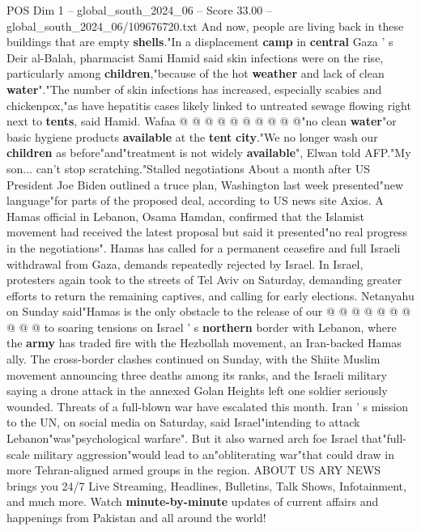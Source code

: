 \begin{textsample}{POS Dim 1 – global\_south\_2024\_06 – Score 33.00 – global\_south\_2024\_06/109676720.txt}
And now, people are living back in these buildings that are empty \textbf{shells}."In a displacement \textbf{camp} in \textbf{central} Gaza ' s Deir al-Balah, pharmacist Sami Hamid said skin infections were on the rise, particularly among \textbf{children},"because of the hot \textbf{weather} and lack of clean \textbf{water}"."The number of skin infections has increased, especially scabies and chickenpox,"as have hepatitis cases likely linked to untreated sewage flowing right next to \textbf{tents}, said Hamid.
Wafaa @ @ @ @ @ @ @ @ @ @"no clean \textbf{water}"or basic hygiene products \textbf{available} at the \textbf{tent} \textbf{city}."We no longer wash our \textbf{children} as before"and"treatment is not widely \textbf{available}", Elwan told AFP."My son... can't stop scratching."Stalled negotiations About a month after US President Joe Biden outlined a truce plan, Washington last week presented"new language"for parts of the proposed deal, according to US news site Axios.
A Hamas official in Lebanon, Osama Hamdan, confirmed that the Islamist movement had received the latest proposal but said it presented"no real progress in the negotiations".
Hamas has called for a permanent ceasefire and full Israeli withdrawal from Gaza, demands repeatedly rejected by Israel.
In Israel, protesters again took to the streets of Tel Aviv on Saturday, demanding greater efforts to return the remaining captives, and calling for early elections.
Netanyahu on Sunday said"Hamas is the only obstacle to the release of our @ @ @ @ @ @ @ @ @ @ to soaring tensions on Israel ' s \textbf{northern} border with Lebanon, where the \textbf{army} has traded fire with the Hezbollah movement, an Iran-backed Hamas ally.
The cross-border clashes continued on Sunday, with the Shiite Muslim movement announcing three deaths among its ranks, and the Israeli military saying a drone attack in the annexed Golan Heights left one soldier seriously wounded.
Threats of a full-blown war have escalated this month.
Iran ' s mission to the UN, on social media on Saturday, said Israel"intending to attack Lebanon"was"psychological warfare".
But it also warned arch foe Israel that"full-scale military aggression"would lead to an"obliterating war"that could draw in more Tehran-aligned armed groups in the region.
ABOUT US ARY NEWS brings you 24/7 Live Streaming, Headlines, Bulletins, Talk Shows, Infotainment, and much more.
Watch \textbf{minute-by-minute} updates of current affairs and happenings from Pakistan and all around the world!

\end{textsample}
